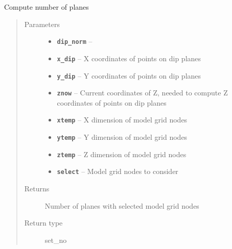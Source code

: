 \documentclass[letterpaper,10pt,english]{sphinxmanual}
\begin{document}

\begin{fulllineitems}
\label{hyvr:hyvr.hyvr.sim.planepoint}
Compute number of planes
\begin{quote}\begin{description}
\item[{Parameters}] \leavevmode\begin{itemize}
\item {} 
\textbf{\texttt{dip\_norm}} -- 

\item {} 
\textbf{\texttt{x\_dip}} -- X coordinates of points on dip planes

\item {} 
\textbf{\texttt{y\_dip}} -- Y coordinates of points on dip planes

\item {} 
\textbf{\texttt{znow}} -- Current coordinates of Z, needed to compute Z coordinates of points on dip planes

\item {} 
\textbf{\texttt{xtemp}} -- X dimension of model grid nodes

\item {} 
\textbf{\texttt{ytemp}} -- Y dimension of model grid nodes

\item {} 
\textbf{\texttt{ztemp}} -- Z dimension of model grid nodes

\item {} 
\textbf{\texttt{select}} -- Model grid nodes to consider

\end{itemize}

\item[{Returns}] \leavevmode
Number of planes with selected model grid nodes

\item[{Return type}] \leavevmode
set\_no

\end{description}\end{quote}

\end{fulllineitems}

\end{document}

